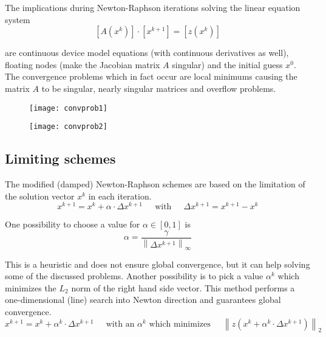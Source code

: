 \addvspace{12pt}

The implications during Newton-Raphson iterations solving the linear
equation system
\begin{equation}
\left[A\left(x^k\right)\right] \cdot \left[x^{k+1}\right] = \left[z\left(x^k\right)\right]
\end{equation}

are continuous device model equations (with continuous derivatives as
well), floating nodes (make the Jacobian matrix $A$ singular) and the
initial guess $x^0$.  The convergence problems which in fact occur are
local minimums causing the matrix $A$ to be singular, nearly singular
matrices and overflow problems.

\begin{figure}[ht]
\begin{center}
\texttt{[image: convprob1]}
\end{center}
\label{fig:ConvProb1}
\end{figure}
\FloatBarrier

\begin{figure}[ht]
\begin{center}
\texttt{[image: convprob2]}
\end{center}
\label{fig:ConvProb2}
\end{figure}
\FloatBarrier

\subsection{Limiting schemes}

The modified (damped) Newton-Raphson schemes are based on the
limitation of the solution vector $x^k$ in each iteration.
\begin{equation}
x^{k+1} = x^k + \alpha\cdot \Delta x^{k+1}
\;\;\;\; \textrm{ with } \;\;\;\;
\Delta x^{k+1} = x^{k+1} - x^k
\end{equation}

One possibility to choose a value for $\alpha \in [0,1]$ is
\begin{equation}
\alpha = \dfrac{\gamma}{\left\lVert\Delta x^{k+1}\right\rVert_{\infty}}
\end{equation}

This is a heuristic and does not ensure global convergence, but it can
help solving some of the discussed problems.  Another possibility is
to pick a value $\alpha^k$ which minimizes the $L_2$ norm of the right
hand side vector.  This method performs a one-dimensional (line)
search into Newton direction and guarantees global convergence.
\begin{equation}
x^{k+1} = x^k + \alpha^k \cdot \Delta x^{k+1}
\;\;\;\; \textrm{ with an } \alpha^k \textrm{ which minimizes } \;\;\;\;
\left\lVert z\left(x^k + \alpha^k \cdot \Delta x^{k+1}\right)\right\rVert_2
\end{equation}

